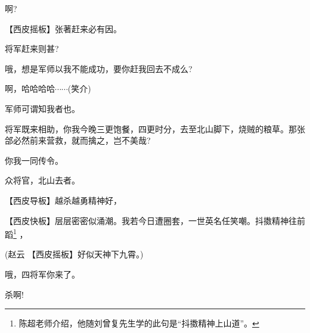 {啊?

【{\akai 西皮摇板}】张著赶来必有因。

将军赶来则甚?

哦，想是军师以我不能成功，要你赶我回去不成么?

啊，哈哈哈哈$\cdots${}$\cdots${}({\hwfs 笑介})

军师可谓知我者也。

将军既来相助，你我今晚三更饱餐，四更时分，去至北山脚下，烧贼的粮草。那张郃必然前来营救，就而擒之，岂不美哉?

你我一同传令。

众将官，北山去者。

\vspace{5pt}

【{\akai 西皮导板}】越杀越勇精神好，

【{\akai 西皮快板}】层层密密似涌潮。我若今日遭圈套，一世英名任笑嘲。抖擞精神往前蹈\footnote{陈超老师介绍，他随刘曾复先生学的此句是``抖擞精神上山道''。}%
，

(赵云\hspace{25pt} 【{\akai 西皮摇板}】好似天神下九霄。)

哦，四将军你来了。

杀啊!
}
